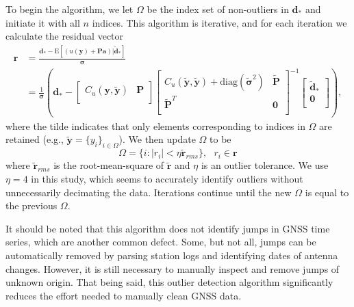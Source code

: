 \documentclass[10pt,a4paper]{article}
\begin{document}
To begin the algorithm, we let $\Omega$ be the index set of non-outliers in $\bm{d}_*$ and initiate it with all $n$ indices. This algorithm is iterative, and for each iteration we calculate the residual vector
\begin{align}\label{eq:Residual}
\bm{r} &= \frac{\bm{d}_* - \mathrm{E}\left[(u(\bm{y}) + \bm{P}\bm{a})|\tilde{\bm{d}}_* \right]}{\bm{\sigma}} \\
       &= \frac{1}{\bm{\sigma}}\left(\bm{d}_*  - 
          \left[\begin{array}{cc}
                C_u(\bm{y},\tilde{\bm{y}}) & \bm{P} \\
                \end{array}\right]
          \left[\begin{array}{cc}
                C_u(\tilde{\bm{y}},\tilde{\bm{y}}) + \mathrm{diag}(\tilde{\bm{\sigma}}^2) & \tilde{\bm{P}} \\
                \tilde{\bm{P}}^T  & \bm{0} \\
                \end{array}\right]^{-1}
          \left[\begin{array}{c}
                \tilde{\bm{d}}_* \\
                \bm{0} \\
                \end{array}\right]\right),
\end{align}
where the tilde indicates that only elements corresponding to indices in $\Omega$ are retained (e.g., $\tilde{\bm{y}} = \{y_i\}_{i\in\Omega}$). We then update $\Omega$ to be
\begin{equation}\label{eq:Update}
\Omega = \{i : |r_i| < \eta \tilde{\bm{r}}_{rms}\}, \ \ \ r_i \in \bm{r}
\end{equation} 
where $\tilde{\bm{r}}_{rms}$ is the root-mean-square of $\tilde{\bm{r}}$ and $\eta$ is an outlier tolerance. We use $\eta=4$ in this study, which seems to accurately identify outliers without unnecessarily decimating the data. Iterations continue until the new $\Omega$ is equal to the previous $\Omega$. 

It should be noted that this algorithm does not identify jumps in GNSS time series, which are another common defect. Some, but not all, jumps can be automatically removed by parsing station logs and identifying dates of antenna changes. However, it is still necessary to manually inspect and remove jumps of unknown origin. That being said, this outlier detection algorithm significantly reduces the effort needed to manually clean GNSS data.       
\end{document}
